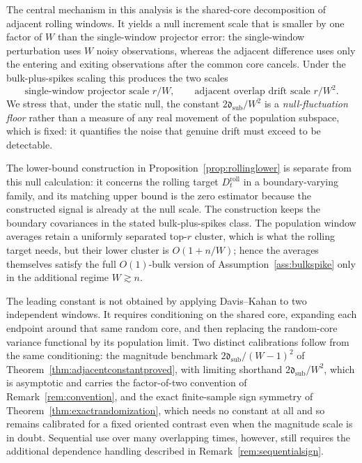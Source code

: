 \documentclass[11pt]{article}
\theoremstyle{tightplain}
\theoremstyle{tightdef}
\begin{document}
The central mechanism in this analysis is the shared-core decomposition of
adjacent rolling windows. It yields a null increment scale that is smaller by
one factor of $W$ than the single-window projector error: the single-window
perturbation uses $W$ noisy observations, whereas the adjacent difference uses
only the entering and exiting observations after the common core cancels. Under
the bulk-plus-spikes scaling this produces the two scales
\[
\text{single-window projector scale } r/W,
\qquad
\text{adjacent overlap drift scale } r/W^2.
\]
We stress that, under the static null, the constant $2\mathfrak d_{\mathrm{sub}}/W^2$
is a \emph{null-fluctuation floor} rather than a measure of any real movement of
the population subspace, which is fixed: it quantifies the noise that genuine
drift must exceed to be detectable.

The lower-bound construction in Proposition~\ref{prop:rollinglower} is separate
from this null calculation: it concerns the rolling target
$D_t^{\mathrm{roll}}$ in a boundary-varying family, and its matching upper
bound is the zero estimator because the constructed signal is already at the
null scale. The construction keeps the boundary covariances in the stated
bulk-plus-spikes class. The population window averages retain a uniformly
separated top-$r$ cluster, which is what the rolling target needs, but their
lower cluster is $O(1+n/W)$; hence the averages themselves satisfy the full
$O(1)$-bulk version of Assumption~\ref{ass:bulkspike} only in the additional
regime $W\gtrsim n$.

The leading constant is not obtained by applying Davis--Kahan
\cite{DavisKahan1970} to two independent windows. It requires conditioning on
the shared core, expanding each endpoint around that same random core, and then
replacing the random-core variance functional by its population limit. Two
distinct calibrations follow from the same conditioning: the magnitude
benchmark $2\mathfrak d_{\mathrm{sub}}/(W-1)^2$ of
Theorem~\ref{thm:adjacentconstantproved}, with limiting shorthand
$2\mathfrak d_{\mathrm{sub}}/W^2$, which is asymptotic and carries the
factor-of-two convention of Remark~\ref{rem:convention}, and the exact
finite-sample sign symmetry of Theorem~\ref{thm:exactrandomization}, which
needs no constant at all and so remains calibrated for a fixed oriented
contrast even when the magnitude scale is in doubt. Sequential use over many
overlapping times, however, still requires the additional dependence handling
described in Remark~\ref{rem:sequentialsign}.
\end{document}
